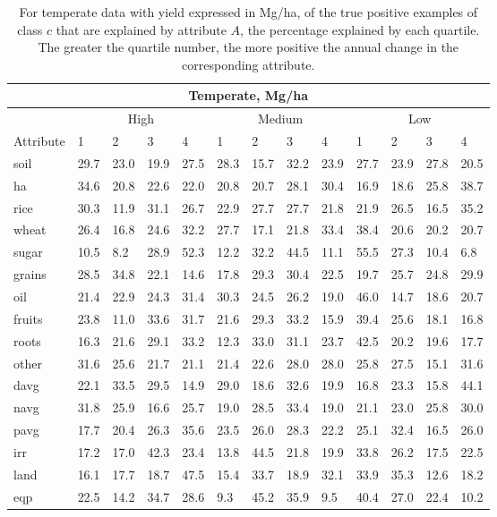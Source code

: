 \documentclass[12pt,twoside]{article}
\begin{document}
\begin{table}
\centering
\begin{tabular}{lllllllllllll}
\toprule
\multicolumn{13}{c}{\textbf{Temperate, Mg/ha}} \\
\midrule
& \multicolumn{4}{c}{High} & \multicolumn{4}{c}{Medium} & \multicolumn{4}{c}{Low} \\
\cmidrule(lr){2-5}
\cmidrule(lr){6-9}
\cmidrule(l){10-13}
Attribute & 1 & 2 & 3 & 4 & 1 & 2 & 3 & 4 & 1 & 2 & 3 & 4 \\
\midrule
soil & 29.7 & 23.0 & 19.9 & 27.5 & 28.3 & 15.7 & 32.2 & 23.9 & 27.7 & 23.9 & 27.8 & 20.5 \\
ha & 34.6 & 20.8 & 22.6 & 22.0 & 20.8 & 20.7 & 28.1 & 30.4 & 16.9 & 18.6 & 25.8 & 38.7 \\
rice & 30.3 & 11.9 & 31.1 & 26.7 & 22.9 & 27.7 & 27.7 & 21.8 & 21.9 & 26.5 & 16.5 & 35.2 \\
wheat & 26.4 & 16.8 & 24.6 & 32.2 & 27.7 & 17.1 & 21.8 & 33.4 & 38.4 & 20.6 & 20.2 & 20.7 \\
sugar & 10.5 & 8.2 & 28.9 & 52.3 & 12.2 & 32.2 & 44.5 & 11.1 & 55.5 & 27.3 & 10.4 & 6.8 \\
grains & 28.5 & 34.8 & 22.1 & 14.6 & 17.8 & 29.3 & 30.4 & 22.5 & 19.7 & 25.7 & 24.8 & 29.9 \\
oil & 21.4 & 22.9 & 24.3 & 31.4 & 30.3 & 24.5 & 26.2 & 19.0 & 46.0 & 14.7 & 18.6 & 20.7 \\
fruits & 23.8 & 11.0 & 33.6 & 31.7 & 21.6 & 29.3 & 33.2 & 15.9 & 39.4 & 25.6 & 18.1 & 16.8 \\
roots & 16.3 & 21.6 & 29.1 & 33.2 & 12.3 & 33.0 & 31.1 & 23.7 & 42.5 & 20.2 & 19.6 & 17.7 \\
other & 31.6 & 25.6 & 21.7 & 21.1 & 21.4 & 22.6 & 28.0 & 28.0 & 25.8 & 27.5 & 15.1 & 31.6 \\
davg & 22.1 & 33.5 & 29.5 & 14.9 & 29.0 & 18.6 & 32.6 & 19.9 & 16.8 & 23.3 & 15.8 & 44.1 \\
navg & 31.8 & 25.9 & 16.6 & 25.7 & 19.0 & 28.5 & 33.4 & 19.0 & 21.1 & 23.0 & 25.8 & 30.0 \\
pavg & 17.7 & 20.4 & 26.3 & 35.6 & 23.5 & 26.0 & 28.3 & 22.2 & 25.1 & 32.4 & 16.5 & 26.0 \\
irr & 17.2 & 17.0 & 42.3 & 23.4 & 13.8 & 44.5 & 21.8 & 19.9 & 33.8 & 26.2 & 17.5 & 22.5 \\
land & 16.1 & 17.7 & 18.7 & 47.5 & 15.4 & 33.7 & 18.9 & 32.1 & 33.9 & 35.3 & 12.6 & 18.2 \\
eqp & 22.5 & 14.2 & 34.7 & 28.6 & 9.3 & 45.2 & 35.9 & 9.5 & 40.4 & 27.0 & 22.4 & 10.2 \\
\bottomrule
\end{tabular}
\captionsetup{width=.7\textwidth}
\caption[Percentage of Examples Explained by Quartile (Temperate, Mg/ha)]{For temperate data with yield expressed in Mg/ha, of the true positive examples of class $c$ that are explained by attribute $A$, the percentage explained by each quartile. The greater the quartile number, the more positive the annual change in the corresponding attribute.}
\label{t.ny.temp.quartiles}
\end{table}
\end{document}
